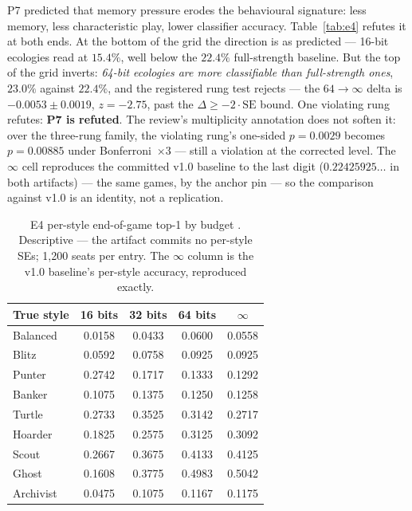 \documentclass[11pt]{article}
\begin{document}
P7 predicted that memory pressure erodes the behavioural signature: less memory, less
characteristic play, lower classifier accuracy. Table~\ref{tab:e4} refutes it at both
ends. At the bottom of the grid the direction is as predicted --- 16-bit ecologies read
at $15.4\%$, well below the $22.4\%$ full-strength baseline. But the top of the grid
inverts: \emph{64-bit ecologies are more classifiable than full-strength ones},
$23.0\%$ against $22.4\%$, and the registered rung test rejects --- the
$64 {\to} \infty$ delta is $-0.0053 \pm 0.0019$, $z = -2.75$, past the
$\Delta \ge -2\cdot\text{SE}$ bound. One violating rung refutes: \textbf{P7 is
refuted}. The review's multiplicity annotation does not soften it: over the three-rung
family, the violating rung's one-sided $p = 0.0029$ becomes $p = 0.00885$ under
Bonferroni~$\times 3$ --- still a violation at the corrected level. The $\infty$ cell
reproduces the committed v1.0 baseline to the last digit ($0.22425925\ldots$ in both
artifacts) --- the same games, by the anchor pin --- so the comparison against v1.0 is
an identity, not a replication.

\begin{table}[t]
\centering
\caption{E4 per-style end-of-game top-1 by budget \cite{artifact}. Descriptive --- the
artifact commits no per-style SEs; 1{,}200 seats per entry. The $\infty$ column is the
v1.0 baseline's per-style accuracy, reproduced exactly.}
\label{tab:e4style}
\footnotesize
\begin{tabular}{@{}lcccc@{}}
\toprule
True style & 16 bits & 32 bits & 64 bits & $\infty$ \\
\midrule
Balanced  & 0.0158 & 0.0433 & 0.0600 & 0.0558 \\
Blitz     & 0.0592 & 0.0758 & 0.0925 & 0.0925 \\
Punter    & 0.2742 & 0.1717 & 0.1333 & 0.1292 \\
Banker    & 0.1075 & 0.1375 & 0.1250 & 0.1258 \\
Turtle    & 0.2733 & 0.3525 & 0.3142 & 0.2717 \\
Hoarder   & 0.1825 & 0.2575 & 0.3125 & 0.3092 \\
Scout     & 0.2667 & 0.3675 & 0.4133 & 0.4125 \\
Ghost     & 0.1608 & 0.3775 & 0.4983 & 0.5042 \\
Archivist & 0.0475 & 0.1075 & 0.1167 & 0.1175 \\
\bottomrule
\end{tabular}
\end{table}
\end{document}
